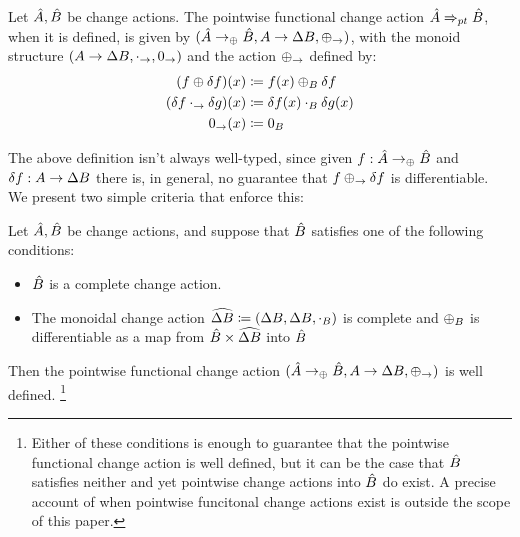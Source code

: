 \begin{defn}
  Let $\hat{A}, \hat{B}$ be change actions. The pointwise functional change action 
  $\hat{A} \Rightarrow_{pt} \hat{B}$, when it is defined,
  is given by $(\hat{A} \rightarrow_\oplus \hat{B}, A \rightarrow \Delta B, \oplus_\rightarrow)$, with
  the monoid structure $(A \rightarrow \Delta B, \cdot_\rightarrow, 0_\rightarrow)$ and the action 
  $\oplus_\rightarrow$ defined by:
  \begin{align*}
    (f \oplus \delta f)(x) &\coloneqq f(x) \oplus_B \delta f\\
    (\delta f \cdot_\rightarrow \delta g)(x) &\coloneqq \delta f(x) \cdot_B \delta g(x)\\
    0_\rightarrow (x) &\coloneqq 0_B
  \end{align*}
\end{defn}

The above definition isn't always well-typed, since given $f : \hat{A} \rightarrow_\oplus \hat{B}$ and
$\delta f : A \rightarrow \Delta B$ there is, in general, no guarantee that 
$f \oplus_\rightarrow \delta f$ is differentiable. We present two simple criteria that enforce this:

\begin{thm}
  Let $\hat{A}, \hat{B}$ be change actions, and suppose that $\hat{B}$ satisfies one of the
  following conditions:
  \begin{itemize}
    \item $\hat{B}$ is a complete change action.
    \item The monoidal change action $\widehat {\Delta B} \coloneqq (\Delta B, \Delta B, \cdot_B)$ is 
      complete and 
      $\oplus_B$ is differentiable as a map from $\hat{B} \times \widehat{\Delta B}$ into $\hat{B}$
  \end{itemize}
  
  Then the pointwise functional change action 
  $(\hat{A} \rightarrow_\oplus \hat{B}, A \rightarrow \Delta B, \oplus_\rightarrow)$ is well defined.
  \footnote{
    Either of these conditions is enough to guarantee that the pointwise functional change action
    is well defined, but it can be the case that $\hat{B}$ satisfies neither and yet pointwise
    change actions into $\hat{B}$ do exist. A precise account of when pointwise funcitonal change
    actions exist is outside the scope of this paper.
  }
\end{thm}

